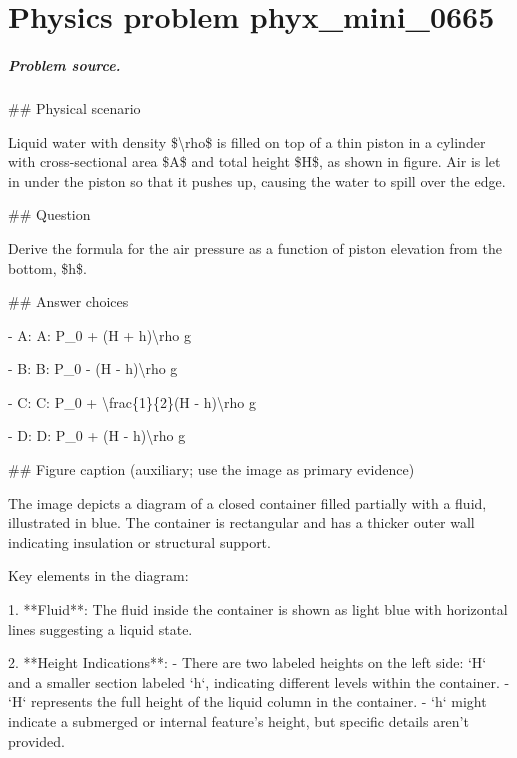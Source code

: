 
\chapter{Physics problem phyx\_mini\_0665}
\label{ch:PhyXMiniProblems_problem_phyx_mini_0665}

\paragraph{Problem source.}
\#\# Physical scenario

Liquid water with density \$\textbackslash{}rho\$ is filled on top of a thin piston in a cylinder with cross-sectional area \$A\$ and total height \$H\$, as shown in figure. Air is let in under the piston so that it pushes up, causing the water to spill over the edge.

\#\# Question

Derive the formula for the air pressure as a function of piston elevation from the bottom, \$h\$.

\#\# Answer choices

- A: A: P\_0 + (H + h)\textbackslash{}rho g

- B: B: P\_0 - (H - h)\textbackslash{}rho g

- C: C: P\_0 + \textbackslash{}frac\{1\}\{2\}(H - h)\textbackslash{}rho g

- D: D: P\_0 + (H - h)\textbackslash{}rho g

\#\# Figure caption (auxiliary; use the image as primary evidence)

The image depicts a diagram of a closed container filled partially with a fluid, illustrated in blue. The container is rectangular and has a thicker outer wall indicating insulation or structural support.

Key elements in the diagram:

1. **Fluid**: The fluid inside the container is shown as light blue with horizontal lines suggesting a liquid state.

2. **Height Indications**: 
   - There are two labeled heights on the left side: `H` and a smaller section labeled `h`, indicating different levels within the container.
   - `H` represents the full height of the liquid column in the container.
   - `h` might indicate a submerged or internal feature's height, but specific details aren't provided.

